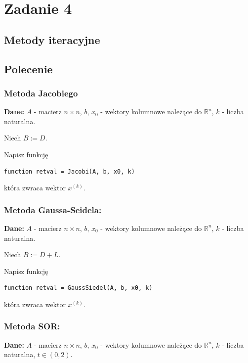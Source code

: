 \documentclass[a4paper, 11pt]{article}
\begin{document}


\section{Zadanie 4}
\subsection{Metody iteracyjne}
\subsection{Polecenie}

\subsubsection{Metoda Jacobiego}
\noindent \textbf{Dane:} \( A \) - macierz \( n \times n \), \( b \), \( x_0 \) - wektory kolumnowe należące do \( \mathbb{R}^n \), \( k \) - liczba naturalna.

Niech \( B := D \). 

Napisz funkcję
\begin{center}
\begin{verbatim}
function retval = Jacobi(A, b, x0, k)
\end{verbatim}
\end{center}
która zwraca wektor \( x^{(k)} \).

\subsubsection{Metoda Gaussa-Seidela:}

\noindent \textbf{Dane:} \( A \) - macierz \( n \times n \), \( b \), \( x_0 \) - wektory kolumnowe należące do \( \mathbb{R}^n \), \( k \) - liczba naturalna.

Niech \( B := D + L \).

Napisz funkcję
\begin{center}
\begin{verbatim}
function retval = GaussSiedel(A, b, x0, k)
\end{verbatim}
\end{center}
która zwraca wektor \( x^{(k)} \).

\subsubsection{Metoda SOR:}

\noindent \textbf{Dane:} \( A \) - macierz \( n \times n \), \( b \), \( x_0 \) - wektory kolumnowe należące do \( \mathbb{R}^n \), \( k \) - liczba naturalna, \( t \in (0, 2) \).
\end{document}
